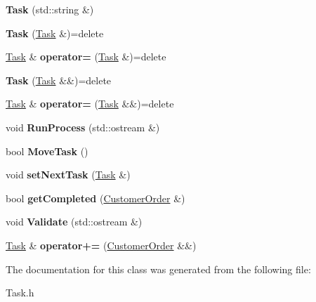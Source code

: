 \begin{DoxyCompactItemize}
\item 
\mbox{\label{class_task_a43834b15cba574ccd4f25af665649776}} 
{\bfseries Task} (std\+::string \&)
\item 
\mbox{\label{class_task_a60073fae7e07b8d1721b1bc73adcc6c8}} 
{\bfseries Task} (\mbox{\hyperlink{class_task}{Task}} \&)=delete
\item 
\mbox{\label{class_task_a95c7171fb2f939f1e4ae9a82f1c7c32d}} 
\mbox{\hyperlink{class_task}{Task}} \& {\bfseries operator=} (\mbox{\hyperlink{class_task}{Task}} \&)=delete
\item 
\mbox{\label{class_task_ae146c98551f244f62b93bc7b4e334580}} 
{\bfseries Task} (\mbox{\hyperlink{class_task}{Task}} \&\&)=delete
\item 
\mbox{\label{class_task_ada7e932e1a40e87069806c264ca3b2c5}} 
\mbox{\hyperlink{class_task}{Task}} \& {\bfseries operator=} (\mbox{\hyperlink{class_task}{Task}} \&\&)=delete
\item 
\mbox{\label{class_task_a1e056ba737379522c8ca23f78929f2f7}} 
void {\bfseries Run\+Process} (std\+::ostream \&)
\item 
\mbox{\label{class_task_ad5f00535195117634b86714e628abd77}} 
bool {\bfseries Move\+Task} ()
\item 
\mbox{\label{class_task_a957d04414498932e8cdc7591722ae0bd}} 
void {\bfseries set\+Next\+Task} (\mbox{\hyperlink{class_task}{Task}} \&)
\item 
\mbox{\label{class_task_af412b718cbb68e36a9c840c42ae2a23a}} 
bool {\bfseries get\+Completed} (\mbox{\hyperlink{class_customer_order}{Customer\+Order}} \&)
\item 
\mbox{\label{class_task_af0b6fb016e2dbd6a5f972d8c74dee39e}} 
void {\bfseries Validate} (std\+::ostream \&)
\item 
\mbox{\label{class_task_a88789fc0b8fb6e1a7fcf35392daeab92}} 
\mbox{\hyperlink{class_task}{Task}} \& {\bfseries operator+=} (\mbox{\hyperlink{class_customer_order}{Customer\+Order}} \&\&)
\end{DoxyCompactItemize}


The documentation for this class was generated from the following file\+:\begin{DoxyCompactItemize}
\item 
Task.\+h\end{DoxyCompactItemize}
